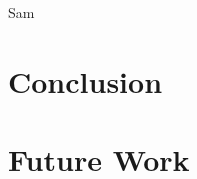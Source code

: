 \documentclass[11pt,a4paper,twocolumn,titlepage]{article}
\begin{document}
Sam

\section{Conclusion} %
\label{sec:conclusion}



\section{Future Work}
\label{sec:future-work}



\newpage


\end{document}
